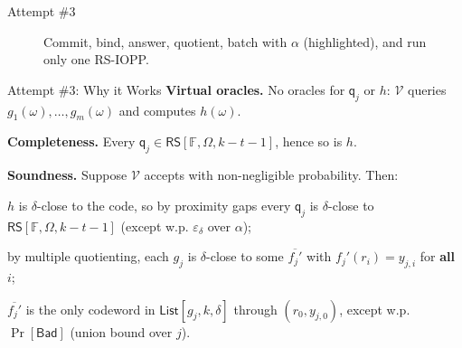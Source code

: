 \documentclass{zkdl-presentation-template}
\newcommand{\oraclestrip}[3]{%
    \foreach \i in {0,...,9} {
        \node[#3] at ([xshift=-1.1cm+0.36cm*\i]#1) {};
    }
    \node[left] at ([xshift=-1.3cm]#1) {#2 $=$};
}
\newcommand{\fromverifier}[2]{%
    \draw[send] ([yshift=#1]vs) -- ([yshift=#1]ps) node[midway, above=0mm]{#2};
}
\newcommand{\fromprover}[2]{%
    \draw[send] ([yshift=#1]ps) -- ([yshift=#1]vs) node[midway, above=0mm]{#2};
}
\begin{document}
\begin{frame}{Attempt \#3}
\begin{figure}
{%
            }
            \caption{Commit, bind, answer, quotient, batch with $\alpha$ (highlighted), and run only one RS-IOPP.}
        \end{figure}
    \end{frame}

    \begin{frame}{Attempt \#3: Why it Works}
        \textbf{Virtual oracles.} No oracles for $\mathsf{q}_j$ or $h$: $\mathcal{V}$ queries $g_1(\omega), \dots, g_m(\omega)$ and computes $h(\omega)$.
        \pause

        \textbf{Completeness.} Every $\mathsf{q}_j \in \mathsf{RS}[\mathbb{F}, \Omega, k - t - 1]$, hence so is $h$.
        \pause

        \textbf{Soundness.} Suppose $\mathcal{V}$ accepts with non-negligible probability. Then:
        \begin{algoen}
            \item<4-> $h$ is $\delta$-close to the code, so by proximity gaps every $\mathsf{q}_j$ is $\delta$-close to $\mathsf{RS}[\mathbb{F}, \Omega, k - t - 1]$ (except w.p. $\varepsilon_\delta$ over $\alpha$);
            \item<5-> by multiple quotienting, each $g_j$ is $\delta$-close to some $\overline{f_j'}$ with $f_j'(r_i) = y_{j,i}$ for \textbf{all} $i$;
            \item<6-> $\overline{f_j'}$ is the only codeword in $\mathsf{List}[g_j, k, \delta]$ through $(r_0, y_{j,0})$, except w.p. $\Pr[\mathsf{Bad}]$ (union bound over $j$).
        \end{algoen}
    \end{frame}
\end{document}
